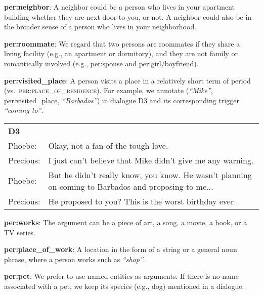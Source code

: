 \documentclass[11pt,a4paper]{article}
\newcommand{\eg}{{e.g.}}
\newcommand{\vs}{{vs.}}
\begin{document}
\noindent  \textbf{per:neighbor}: A neighbor could be a person who lives in your apartment building whether they are next door to you, or not. A neighbor could also be in the broader sense of a person who lives in your neighborhood. 

\noindent  \textbf{per:roommate}: We regard that two persons are roommates if they share a living facility (\eg, an apartment or dormitory), and they are not family or romantically involved (\eg, per:spouse and per:girl/boyfriend).

\noindent  \textbf{per:visited\_place}: A person visits a place in a relatively short term of period (\vs~\textsc{per:place\_of\_residence}). For example, we annotate (\emph{``Mike''}, per:visited\_place, \emph{``Barbados''}) in dialogue D3 and its corresponding trigger \emph{``coming to''}. 

\begin{table}[h!]
\centering
\footnotesize
\begin{tabular}{p{1cm}p{5.8cm}}
\toprule
\textbf{D3} &\\
Phoebe: & Okay, not a fan of the tough love. \\
Precious: & I just can't believe that Mike didn't give me any warning.  \\
Phoebe: &  But he didn't really know, you know. He wasn't planning on coming to Barbados and proposing to me... \\
Precious: &  He proposed to you? This is the worst birthday ever.\\
\bottomrule
\end{tabular}
\end{table}


\noindent  \textbf{per:works}: The argument can be a piece of art, a song, a movie, a book, or a TV series.  


\noindent  \textbf{per:place\_of\_work}: A location in the form of a string or a general noun phrase, where a person works such as \emph{``shop''}.


\noindent  \textbf{per:pet}: We prefer to use named entities as arguments. If there is no name associated with a pet, we keep its species (\eg, dog) mentioned in a dialogue.
\end{document}
